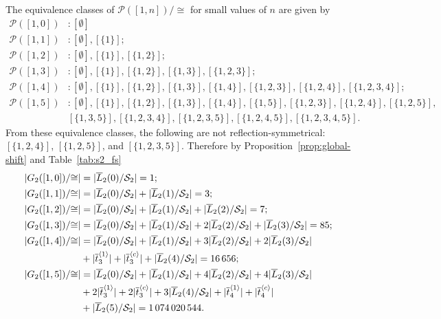 \documentclass[11pt,a4paper]{article}
\begin{document}
The equivalence classes of $\mathcal{P}([1,n])/{\cong}$ for small values of $n$ are given by
\begin{align*}
\mathcal{P}([1,0]) & : [\emptyset] \\
\mathcal{P}([1,1]) & : [\emptyset], [\{1\}];  \\
\mathcal{P}([1,2]) & : [\emptyset], [\{1\}],  [\{1,2\}]; \\
\mathcal{P}([1,3]) & : [\emptyset], [\{1\}],  [\{1,2\}], [\{1,3\}], [\{1,2,3\}]; \\
\mathcal{P}([1,4]) & : [\emptyset], [\{1\}],  [\{1,2\}], [\{1,3\}], [\{1,4\}], [\{1,2,3\}], [\{1,2,4\}], [\{1,2,3,4\}]; \\
\mathcal{P}([1,5]) & : [\emptyset], [\{1\}],  [\{1,2\}], [\{1,3\}], [\{1,4\}], [\{1,5\}], [\{1,2,3\}], [\{1,2,4\}], [\{1,2,5\}], \\
        &  [\{1,3,5\}], [\{1,2,3,4\}], [\{1,2,3,5\}], [\{1,2,4,5\}], [\{1,2,3,4,5\}].
\end{align*}
From these equivalence classes, the following are not reflection-symmetrical: $[\{1,2,4\}]$, $[\{1,2,5\}]$, and $[\{1,2,3,5\}]$.
Therefore by Proposition~\ref{prop:global-shift} and Table~\ref{tab:s2_fs}
\begin{align}
|G_2([1,0])/{\cong}| & = |\overline{L}_2(0) / \mathcal{S}_2| = 1; \notag \\
|G_2([1,1])/{\cong}| & = |\overline{L}_2(0) / \mathcal{S}_2| + |\overline{L}_2(1) / \mathcal{S}_2| = 3; \notag \\
|G_2([1,2])/{\cong}| & = |\overline{L}_2(0) / \mathcal{S}_2| + |\overline{L}_2(1) / \mathcal{S}_2|
+ |\overline{L}_2(2) / \mathcal{S}_2| = 7; \notag \\
|G_2([1,3])/{\cong}| & = |\overline{L}_2(0) / \mathcal{S}_2| +  |\overline{L}_2(1) / \mathcal{S}_2|
+ 2 |\overline{L}_2(2) / \mathcal{S}_2|
 + |\overline{L}_2(3) / \mathcal{S}_2| = 85; \label{eq:classes85}\\
|G_2([1,4])/{\cong}| & = |\overline{L}_2(0) / \mathcal{S}_2| + |\overline{L}_2(1) / \mathcal{S}_2|
+ 3 |\overline{L}_2(2) / \mathcal{S}_2| + 2 |\overline{L}_2(3) / \mathcal{S}_2| \notag \\
& + |\overline{t}^{\langle 1 \rangle}_3| + |\overline{t}^{\langle c \rangle}_3|
+ |\overline{L}_2(4) / \mathcal{S}_2| = 16\,656; \notag \\
|G_2([1,5])/{\cong}| & = |\overline{L}_2(0) / \mathcal{S}_2| + |\overline{L}_2(1) / \mathcal{S}_2|
+ 4 |\overline{L}_2(2) / \mathcal{S}_2|+ 4 |\overline{L}_2(3) / \mathcal{S}_2| \notag \\
& + 2|\overline{t}^{\langle 1 \rangle}_3| + 2|\overline{t}^{\langle c \rangle}_3|
+ 3 |\overline{L}_2(4) / \mathcal{S}_2| + |\overline{t}^{\langle 1 \rangle}_4| + |\overline{t}^{\langle c \rangle}_4| \notag \\
& +  |\overline{L}_2(5) / \mathcal{S}_2| = 1\,074\,020\,544 \notag.
\end{align}
\end{document}
